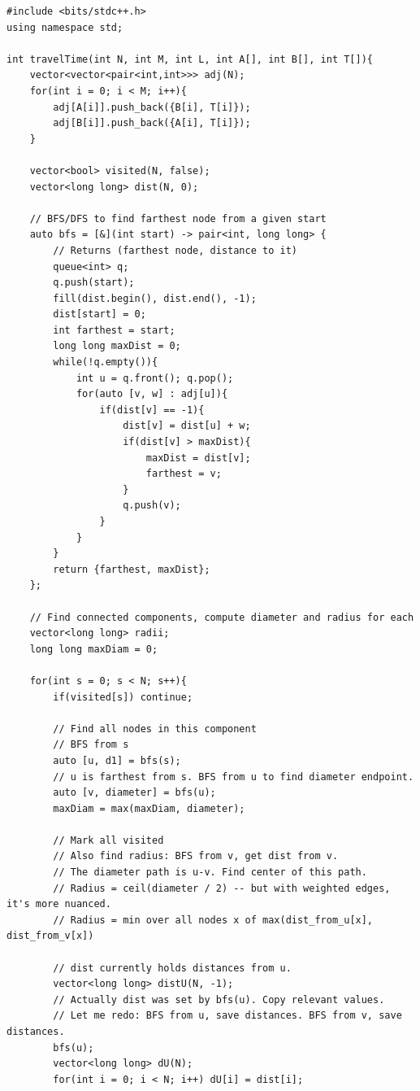 \documentclass[11pt,a4paper]{article}
\begin{document}
\begin{lstlisting}
#include <bits/stdc++.h>
using namespace std;

int travelTime(int N, int M, int L, int A[], int B[], int T[]){
    vector<vector<pair<int,int>>> adj(N);
    for(int i = 0; i < M; i++){
        adj[A[i]].push_back({B[i], T[i]});
        adj[B[i]].push_back({A[i], T[i]});
    }

    vector<bool> visited(N, false);
    vector<long long> dist(N, 0);

    // BFS/DFS to find farthest node from a given start
    auto bfs = [&](int start) -> pair<int, long long> {
        // Returns (farthest node, distance to it)
        queue<int> q;
        q.push(start);
        fill(dist.begin(), dist.end(), -1);
        dist[start] = 0;
        int farthest = start;
        long long maxDist = 0;
        while(!q.empty()){
            int u = q.front(); q.pop();
            for(auto [v, w] : adj[u]){
                if(dist[v] == -1){
                    dist[v] = dist[u] + w;
                    if(dist[v] > maxDist){
                        maxDist = dist[v];
                        farthest = v;
                    }
                    q.push(v);
                }
            }
        }
        return {farthest, maxDist};
    };

    // Find connected components, compute diameter and radius for each
    vector<long long> radii;
    long long maxDiam = 0;

    for(int s = 0; s < N; s++){
        if(visited[s]) continue;

        // Find all nodes in this component
        // BFS from s
        auto [u, d1] = bfs(s);
        // u is farthest from s. BFS from u to find diameter endpoint.
        auto [v, diameter] = bfs(u);
        maxDiam = max(maxDiam, diameter);

        // Mark all visited
        // Also find radius: BFS from v, get dist from v.
        // The diameter path is u-v. Find center of this path.
        // Radius = ceil(diameter / 2) -- but with weighted edges, it's more nuanced.
        // Radius = min over all nodes x of max(dist_from_u[x], dist_from_v[x])

        // dist currently holds distances from u.
        vector<long long> distU(N, -1);
        // Actually dist was set by bfs(u). Copy relevant values.
        // Let me redo: BFS from u, save distances. BFS from v, save distances.
        bfs(u);
        vector<long long> dU(N);
        for(int i = 0; i < N; i++) dU[i] = dist[i];


\end{lstlisting}
\end{document}
